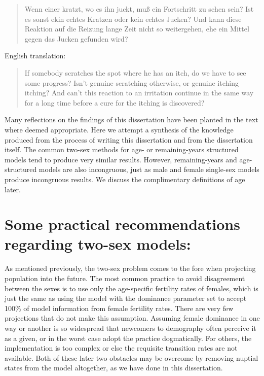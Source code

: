\FloatBarrier
\label{sec:reflections}

\begin{singlespace}
\begin{quote}
Wenn einer kratzt, wo es ihn juckt, mu{\ss} ein Fortschritt zu sehen sein? Ist
es sonst ekin echtes Kratzen oder kein echtes Jucken? Und kann diese Reaktion
auf die Reizung lange Zeit nicht so weitergehen, ehe ein Mittel gegen das Jucken
gefunden wird?
\citep{wittgenstein1984culture}
\end{quote}

English translation:
\begin{quote}
 If somebody scratches the spot where he has an itch, do we have to see 
 some progress? Isn't genuine scratching otherwise, or genuine itching 
itching? And can't this reaction to an irritation continue in the 
same way for a long time before a cure for the itching is discovered?
\citep{wittgenstein1984culture}
\end{quote}
\end{singlespace}

Many reflections on the findings of this dissertation have been planted in the
text where deemed appropriate. Here we attempt a synthesis of the
knowledge produced from the process of writing this dissertation and from the
dissertation itself. The common two-sex methods for age- or remaining-years
structured models tend to produce very similar results. However, remaining-years
and age-structured models are also incongruous, just as male and female
single-sex models produce incongruous results. We discuss the complimentary definitions 
of age later. 

\section{Some practical recommendations regarding two-sex models: }
As mentioned previously, the two-sex problem comes to the fore when projecting
population into the future. The most common practice to avoid disagreement between the sexes is to
use only the age-specific fertility rates of females, which is just the same as
using the \citet{goodman1967age} model with the dominance parameter set to
accept 100\% of model information from female fertility rates. There are
very few projections that do not make this assumption. Assuming female dominance
in one way or another is so widespread that newcomers to demography often perceive 
it as a given, or in the worst case adopt the
practice dogmatically. For others, the implementation is too complex or
else the requisite transition rates are not available. Both of these later
two obstacles may be overcome by removing nuptial states from the model
altogether, as we have done in this dissertation. 

